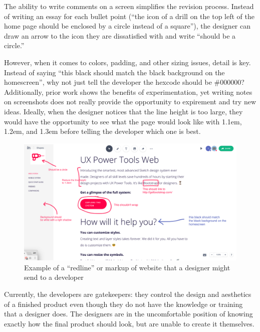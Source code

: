 \documentclass{sigchi}
\begin{document}
The ability to write comments on a screen simplifies the revision process. Instead of writing an essay for each bullet point (``the icon of a drill on the top left of the home page should be enclosed by a circle instead of a square''), the designer can draw an arrow to the icon they are dissatisfied with and write ``should be a circle.'' 

However, when it comes to colors, padding, and other sizing issues, detail is key. Instead of saying ``this black should match the black background on the homescreen'', why not just tell the developer the hexcode should be \#000000? Additionally, prior work shows the benefits of experimentation, yet writing notes on screenshots does not really provide the opportunity to expirement and try new ideas. Ideally, when the designer notices that the line height is too large, they would have the opportunity to see what the page would look like with 1.1em, 1.2em, and 1.3em before telling the developer which one is best. 

\begin{figure}
    \centering
    \includegraphics[width=\columnwidth]{figures/screenshot_redline_found_google.png}
    \caption{Example of a ``redline'' or markup of website that a designer might send to a developer}
    \label{fig:markup_redline_website}
\end{figure}


Currently, the developers are gatekeepers: they control the design and aesthetics of a finished product even though they do not have the knowledge or training that a designer does. The designers are in the uncomfortable position of knowing exactly how the final product should look, but are unable to create it themselves. 
\end{document}
